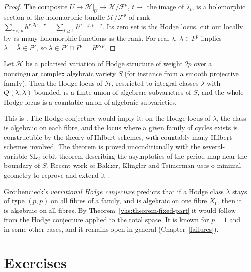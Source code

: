 \begin{proof}
The composite $U \to \mathcal{H}|_U \to \mathcal{H}/\mathcal{F}^p$, $t \mapsto$ the image of $\lambda_t$, is a holomorphic section of the holomorphic bundle $\mathcal{H}/\mathcal{F}^p$ of rank
$\sum_{r < p}h^{r,2p-r} = \sum_{j \geq 1}h^{p-j,p+j}$. Its zero set is the Hodge locus, cut out locally by as many holomorphic functions as the rank. For real $\lambda$, $\lambda \in F^p$ implies
$\lambda = \bar\lambda \in \overline{F^p}$, so $\lambda \in F^p \cap \overline{F^p} = H^{p,p}$.
\end{proof}

\begin{theorem}\label{vhs:theorem-cdk}
Let $\mathcal{H}$ be a polarised variation of Hodge structure of weight $2p$ over a nonsingular complex algebraic variety $S$ (for instance from a smooth projective family). Then the Hodge locus of $\mathcal{H}$,
restricted to integral classes $\lambda$ with $Q(\lambda, \lambda)$ bounded, is a finite union of algebraic subvarieties of $S$, and the whole Hodge locus is a countable union of algebraic subvarieties.
\end{theorem}

This is \cite{cattani-deligne-kaplan}. The Hodge conjecture would imply it: on the Hodge locus of $\lambda$, the class is algebraic on each fibre, and the locus where a given family of cycles exists is
constructible by the theory of Hilbert schemes, with countably many Hilbert schemes involved. The theorem is proved unconditionally with the several-variable $\mathrm{SL}_2$-orbit theorem describing
the asymptotics of the period map near the boundary of $S$. Recent work of Bakker, Klingler and Tsimerman uses o-minimal geometry to reprove and extend it \cite{bakker-klingler-tsimerman}.

\begin{remark}\label{vhs:remark-variational}
Grothendieck's \emph{variational Hodge conjecture} predicts that if a Hodge class $\lambda$ stays of type $(p,p)$ on all fibres of a family, and is algebraic on one fibre $X_0$, then it is algebraic on all fibres.
By Theorem~\ref{vhs:theorem-fixed-part} it would follow from the Hodge conjecture applied to the total space. It is known for $p = 1$ and in some other cases, and it remains open in general
(Chapter~\ref{failures}).
\end{remark}

\section{Exercises}\label{vhs:section-exercises}

